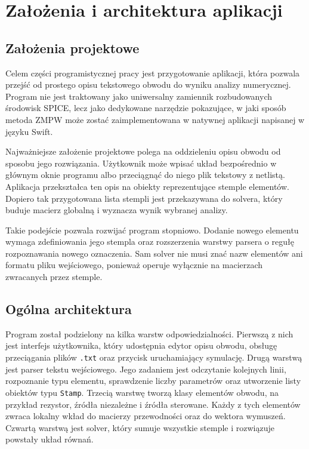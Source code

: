 \chapter{Założenia i architektura aplikacji}
\label{chap:projekt-programu}

\section{Założenia projektowe}
\label{sec:zalozenia-projektowe}

Celem części programistycznej pracy jest przygotowanie aplikacji, która pozwala przejść od prostego opisu tekstowego obwodu do wyniku analizy numerycznej. Program nie jest traktowany jako uniwersalny zamiennik rozbudowanych środowisk SPICE, lecz jako dedykowane narzędzie pokazujące, w jaki sposób metoda ZMPW może zostać zaimplementowana w natywnej aplikacji napisanej w języku Swift.

Najważniejsze założenie projektowe polega na oddzieleniu opisu obwodu od sposobu jego rozwiązania. Użytkownik może wpisać układ bezpośrednio w głównym oknie programu albo przeciągnąć do niego plik tekstowy z netlistą. Aplikacja przekształca ten opis na obiekty reprezentujące stemple elementów. Dopiero tak przygotowana lista stempli jest przekazywana do solvera, który buduje macierz globalną i wyznacza wynik wybranej analizy.

Takie podejście pozwala rozwijać program stopniowo. Dodanie nowego elementu wymaga zdefiniowania jego stempla oraz rozszerzenia warstwy parsera o regułę rozpoznawania nowego oznaczenia. Sam solver nie musi znać nazw elementów ani formatu pliku wejściowego, ponieważ operuje wyłącznie na macierzach zwracanych przez stemple.

\section{Ogólna architektura}
\label{sec:ogolna-architektura}

Program został podzielony na kilka warstw odpowiedzialności. Pierwszą z nich jest interfejs użytkownika, który udostępnia edytor opisu obwodu, obsługę przeciągania plików \texttt{.txt} oraz przycisk uruchamiający symulację. Drugą warstwą jest parser tekstu wejściowego. Jego zadaniem jest odczytanie kolejnych linii, rozpoznanie typu elementu, sprawdzenie liczby parametrów oraz utworzenie listy obiektów typu \texttt{Stamp}. Trzecią warstwę tworzą klasy elementów obwodu, na przykład rezystor, źródła niezależne i źródła sterowane. Każdy z tych elementów zwraca lokalny wkład do macierzy przewodności oraz do wektora wymuszeń. Czwartą warstwą jest solver, który sumuje wszystkie stemple i rozwiązuje powstały układ równań.

